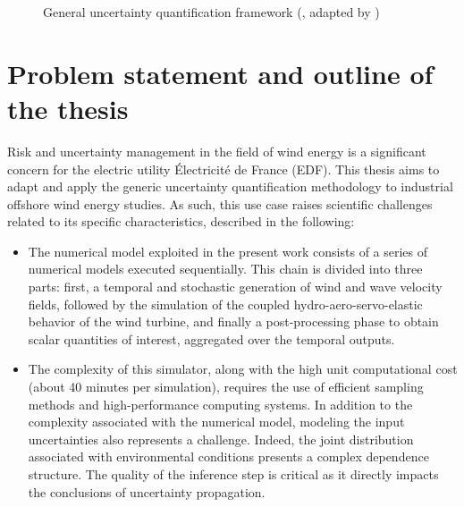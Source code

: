 \begin{figure}[!h]
    \centering
    
    \caption{General uncertainty quantification framework (\cite{rocquigny_2008}, adapted by \cite{ajenjo_2023})}
    \label{fig:UQ_methodo}
\end{figure}


\section*{Problem statement and outline of the thesis}

Risk and uncertainty management in the field of wind energy is a significant concern for the electric utility Électricité de France (EDF). 
This thesis aims to adapt and apply the generic uncertainty quantification methodology to industrial offshore wind energy studies. 
As such, this use case raises scientific challenges related to its specific characteristics, described in the following:
\begin{itemize}
    \item The numerical model exploited in the present work consists of a series of numerical models executed sequentially. 
    This chain is divided into three parts: first, a temporal and stochastic generation of wind and wave velocity fields, 
    followed by the simulation of the coupled hydro-aero-servo-elastic behavior of the wind turbine, 
    and finally a post-processing phase to obtain scalar quantities of interest, aggregated over the temporal outputs. 
    \item The complexity of this simulator, along with the high unit computational cost (about 40 minutes per simulation), requires the use of efficient sampling methods and high-performance computing systems. 
    In addition to the complexity associated with the numerical model, modeling the input uncertainties also represents a challenge. 
    Indeed, the joint distribution associated with environmental conditions presents a complex dependence structure.   
    The quality of the inference step is critical as it directly impacts the conclusions of uncertainty propagation.
\end{itemize}

